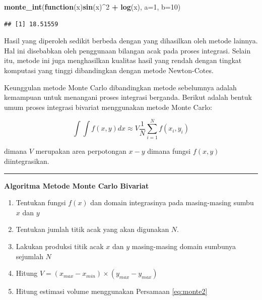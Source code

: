 \documentclass[]{book}
\newenvironment{Shaded}{\begin{snugshade}}{\end{snugshade}}
\newcommand{\ControlFlowTok}[1]{\textcolor[rgb]{0.13,0.29,0.53}{\textbf{#1}}}
\newcommand{\DataTypeTok}[1]{\textcolor[rgb]{0.13,0.29,0.53}{#1}}
\newcommand{\DecValTok}[1]{\textcolor[rgb]{0.00,0.00,0.81}{#1}}
\newcommand{\KeywordTok}[1]{\textcolor[rgb]{0.13,0.29,0.53}{\textbf{#1}}}
\newcommand{\NormalTok}[1]{#1}
\newcommand{\OperatorTok}[1]{\textcolor[rgb]{0.81,0.36,0.00}{\textbf{#1}}}
\newcommand{\StringTok}[1]{\textcolor[rgb]{0.31,0.60,0.02}{#1}}
\providecommand{\tightlist}{%
  \setlength{\itemsep}{0pt}\setlength{\parskip}{0pt}}
\theoremstyle{definition}
\theoremstyle{definition}
\theoremstyle{definition}
\theoremstyle{remark}
\begin{document}
\begin{Shaded}
\begin{Highlighting}[]
\KeywordTok{monte_int}\NormalTok{(}\ControlFlowTok{function}\NormalTok{(x)}\KeywordTok{sin}\NormalTok{(x)}\OperatorTok{^}\DecValTok{2} \OperatorTok{+}\StringTok{ }\KeywordTok{log}\NormalTok{(x), }\DataTypeTok{a=}\DecValTok{1}\NormalTok{, }\DataTypeTok{b=}\DecValTok{10}\NormalTok{)}
\end{Highlighting}
\end{Shaded}

\begin{verbatim}
## [1] 18.51559
\end{verbatim}

Hasil yang diperoleh sedikit berbeda dengan yang dihasilkan oleh metode lainnya. Hal ini disebabkan oleh penggunaan bilangan acak pada proses integrasi. Selain itu, metode ini juga menghasilkan kualitas hasil yang rendah dengan tingkat komputasi yang tinggi dibandingkan dengan metode Newton-Cotes.

Keunggulan metode Monte Carlo dibandingkan metode sebelumnya adalah kemampuan untuk menangani proses integrasi berganda. Berikut adalah bentuk umum proses integrasi bivariat menggunakan metode Monte Carlo:

\begin{equation}
\int \int f\left(x,y\right)dx\approx V\frac{1}{N}\sum_{i=1}^Nf\left(x_i,y_i\right)
  \label{eq:monte2}
\end{equation}

dimana \(V\) merupakan area perpotongan \(x-y\) dimana fungsi \(f\left(x,y\right)\) diintegrasikan.

\begin{center}\rule{0.5\linewidth}{\linethickness}\end{center}

\textbf{Algoritma Metode Monte Carlo Bivariat}

\begin{enumerate}
\def\labelenumi{\arabic{enumi}.}
\tightlist
\item
  Tentukan fungsi \(f\left(x\right)\) dan domain integrasinya pada masing-masing sumbu \(x\) dan \(y\)
\item
  Tentukan jumlah titik acak yang akan digunakan \(N\).
\item
  Lakukan produksi titik acak \(x\) dan \(y\) masing-masing domain sumbunya sejumlah \(N\)
\item
  Hitung \(V=\left( x_{max}-x_{min}\right) \times \left(y_{max}-y_{max}\right)\)
\item
  Hitung estimasi volume menggunakan Persamaan \eqref{eq:monte2}
\end{enumerate}
\end{document}
